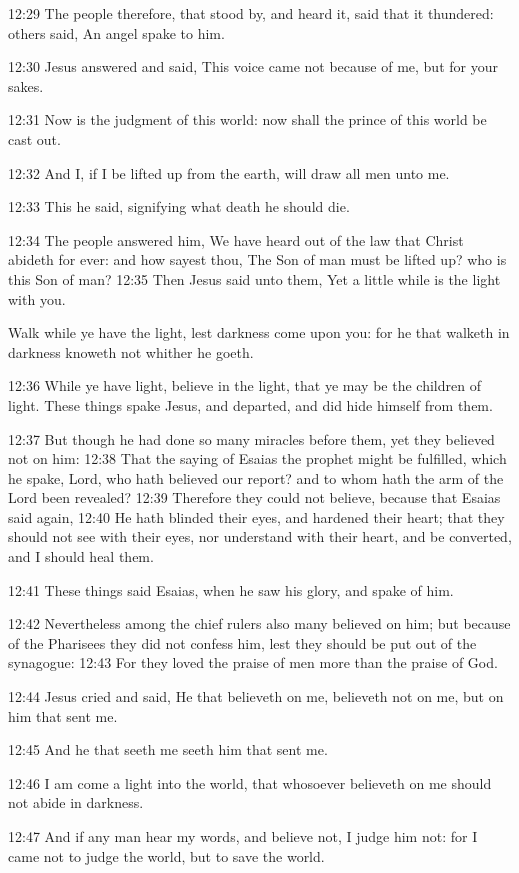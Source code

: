 12:29 The people therefore, that stood by, and heard it, said that it
thundered: others said, An angel spake to him.

12:30 Jesus answered and said, This voice came not because of me, but
for your sakes.

12:31 Now is the judgment of this world: now shall the prince of this
world be cast out.

12:32 And I, if I be lifted up from the earth, will draw all men unto
me.

12:33 This he said, signifying what death he should die.

12:34 The people answered him, We have heard out of the law that
Christ abideth for ever: and how sayest thou, The Son of man must be
lifted up? who is this Son of man?  12:35 Then Jesus said unto them,
Yet a little while is the light with you.

Walk while ye have the light, lest darkness come upon you: for he that
walketh in darkness knoweth not whither he goeth.

12:36 While ye have light, believe in the light, that ye may be the
children of light. These things spake Jesus, and departed, and did
hide himself from them.

12:37 But though he had done so many miracles before them, yet they
believed not on him: 12:38 That the saying of Esaias the prophet might
be fulfilled, which he spake, Lord, who hath believed our report? and
to whom hath the arm of the Lord been revealed?  12:39 Therefore they
could not believe, because that Esaias said again, 12:40 He hath
blinded their eyes, and hardened their heart; that they should not see
with their eyes, nor understand with their heart, and be converted,
and I should heal them.

12:41 These things said Esaias, when he saw his glory, and spake of
him.

12:42 Nevertheless among the chief rulers also many believed on him;
but because of the Pharisees they did not confess him, lest they
should be put out of the synagogue: 12:43 For they loved the praise of
men more than the praise of God.

12:44 Jesus cried and said, He that believeth on me, believeth not on
me, but on him that sent me.

12:45 And he that seeth me seeth him that sent me.

12:46 I am come a light into the world, that whosoever believeth on me
should not abide in darkness.

12:47 And if any man hear my words, and believe not, I judge him not:
for I came not to judge the world, but to save the world.

